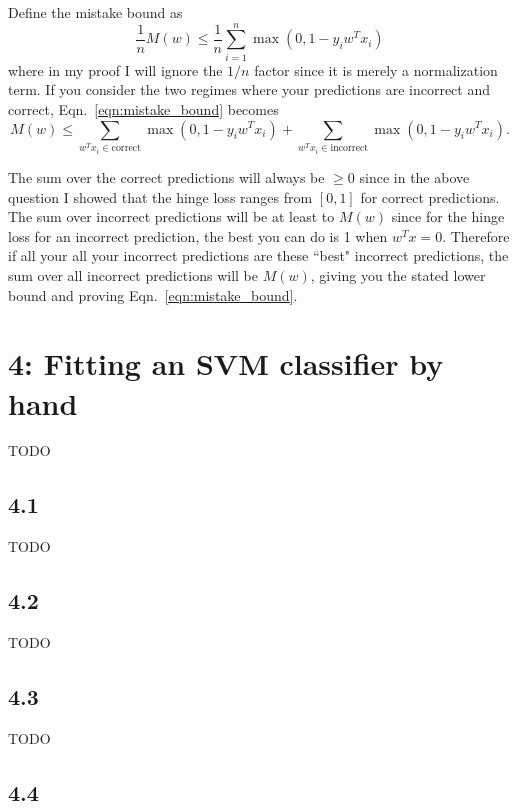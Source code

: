 \documentclass[12pt]{amsart}
\begin{document}
Define the mistake bound as
\begin{equation} \label{eqn:mistake_bound}
\frac{1}{n}M(w) \leq \frac{1}{n}\sum_{i = 1}^n \max(0, 1 - y_i w^T x_i)
\end{equation}
where in my proof I will ignore the $1/n$ factor since it is merely a normalization term.  If you consider the two regimes where your predictions are incorrect and correct, Eqn.~\ref{eqn:mistake_bound} becomes
\begin{equation} \label{eqn:mb} 
M(w) \leq \sum_{w^Tx_i \in \text{correct}} \max(0, 1 - y_i w^T x_i) + \sum_{w^Tx_i \in \text{incorrect}} \max(0, 1 - y_i w^T x_i).
\end{equation}

The sum over the correct predictions will always be $\geq 0$ since in the above question I showed that the hinge loss ranges from $[0,1]$ for correct predictions.  The sum over incorrect predictions will be at least to $M(w)$ since for the hinge loss for an incorrect prediction, the best you can do is 1 when $w^Tx = 0$.  Therefore if all your all your incorrect predictions are these ``best" incorrect predictions, the sum over all incorrect predictions will be $M(w)$, giving you the stated lower bound and proving Eqn.~\ref{eqn:mistake_bound}.  

\section*{4: Fitting an SVM classifier by hand}

TODO

\subsection*{4.1}

TODO

\subsection*{4.2}

TODO

\subsection*{4.3}

TODO

\subsection*{4.4}
\end{document}
